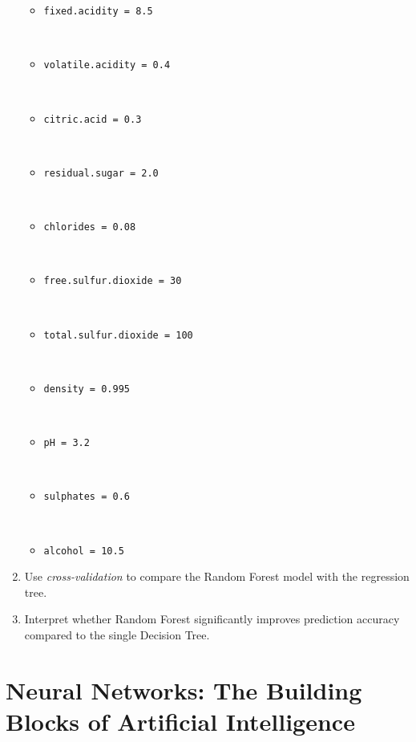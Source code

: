 \documentclass[
]{book}
\newcommand{\passthrough}[1]{#1}
\providecommand{\tightlist}{%
  \setlength{\itemsep}{0pt}\setlength{\parskip}{0pt}}
\theoremstyle{definition}
\theoremstyle{definition}
\theoremstyle{definition}
\theoremstyle{definition}
\theoremstyle{remark}
\begin{document}
\begin{enumerate}
  \begin{itemize}
  \tightlist
  \item
    \passthrough{\lstinline!fixed.acidity = 8.5!}\strut \\
  \item
    \passthrough{\lstinline!volatile.acidity = 0.4!}\strut \\
  \item
    \passthrough{\lstinline!citric.acid = 0.3!}\strut \\
  \item
    \passthrough{\lstinline!residual.sugar = 2.0!}\strut \\
  \item
    \passthrough{\lstinline!chlorides = 0.08!}\strut \\
  \item
    \passthrough{\lstinline!free.sulfur.dioxide = 30!}\strut \\
  \item
    \passthrough{\lstinline!total.sulfur.dioxide = 100!}\strut \\
  \item
    \passthrough{\lstinline!density = 0.995!}\strut \\
  \item
    \passthrough{\lstinline!pH = 3.2!}\strut \\
  \item
    \passthrough{\lstinline!sulphates = 0.6!}\strut \\
  \item
    \passthrough{\lstinline!alcohol = 10.5!}
  \end{itemize}
\item
  Use \emph{cross-validation} to compare the Random Forest model with the regression tree.\\
\item
  Interpret whether Random Forest significantly improves prediction accuracy compared to the single Decision Tree.
\end{enumerate}

\chapter{Neural Networks: The Building Blocks of Artificial Intelligence}\label{chapter-nn}
\end{document}
